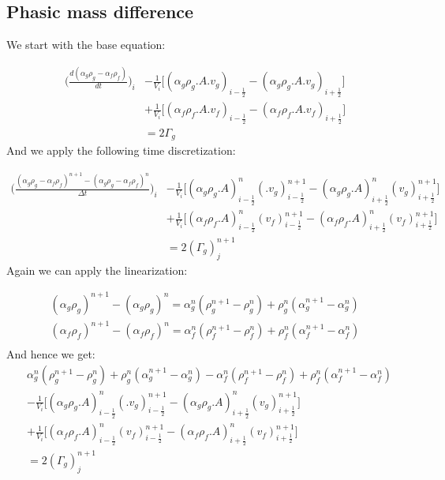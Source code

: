 \documentclass[11pt,letterpaper,titlepage]{article}
\newcommand{\half}{\frac{1}{2}}
\begin{document}
\newpage
\subsection{Phasic mass difference}
We start with the base equation:

\begin{equation*}
\begin{aligned}
\biggr ( \frac{d(\alpha_g \rho_g-\alpha_f\rho_f)}{dt} \biggr )_i
&-\frac{1}{V_i}\biggr[ (\alpha_g\rho_g.A.v_g)_{i-\half}-(\alpha_g\rho_g.A.v_g)_{i+\half} \biggr]\\
&+ \frac{1}{V_i}\biggr[ (\alpha_f\rho_f.A.v_f)_{i-\half}-(\alpha_f\rho_f.A.v_f)_{i+\half} \biggr]\\
&=2\Gamma_g
\end{aligned}
\end{equation*}
\newline
\noindent
And we apply the following time discretization:

\begin{equation*}
\begin{aligned}
\biggr ( \frac{(\alpha_g \rho_g-\alpha_f\rho_f)^{n+1}-(\alpha_g \rho_g-\alpha_f\rho_f)^n}{\Delta t} \biggr )_i
&-\frac{1}{V_i}\biggr[(\alpha_g\rho_g.A)_{i-\half}^{n} (.v_g)_{i-\half}^{n+1}
-(\alpha_g\rho_g.A)_{i+\half}^{n} (v_g)_{i+\half}^{n+1} \biggr]\\
&+ \frac{1}{V_i}\biggr[(\alpha_f\rho_f.A)_{i-\half}^{n} (v_f)_{i-\half}^{n+1}
-(\alpha_f\rho_f.A)_{i+\half}^{n} (v_f)_{i+\half}^{n+1} \biggr]\\
&=2(\Gamma_g)_j^{n+1}
\end{aligned}
\end{equation*}
\newline 
\noindent Again we can apply the linearization:

\begin{equation*}
\begin{aligned}
(\alpha_g \rho_g)^{n+1}-(\alpha_g \rho_g)^{n} = \alpha_g^n (\rho_g^{n+1}-\rho_g^n)+\rho_g^n(\alpha_g^{n+1}-\alpha_g^n)\\
(\alpha_f \rho_f)^{n+1}-(\alpha_f \rho_f)^{n} = \alpha_f^n (\rho_f^{n+1}-\rho_f^n)+\rho_f^n(\alpha_f^{n+1}-\alpha_f^n)\\
\end{aligned}
\end{equation*}
\newline
\noindent And hence we get:
\begin{equation} \label{eq:diffmass}
\begin{aligned}
&\alpha_g^n (\rho_g^{n+1}-\rho_g^n)+\rho_g^n(\alpha_g^{n+1}-\alpha_g^n)-\alpha_f^n (\rho_f^{n+1}-\rho_f^n)+\rho_f^n(\alpha_f^{n+1}-\alpha_f^n)\\
&-\frac{1}{V_i}\biggr[(\alpha_g\rho_g.A)_{i-\half}^{n} (.v_g)_{i-\half}^{n+1}
-(\alpha_g\rho_g.A)_{i+\half}^{n} (v_g)_{i+\half}^{n+1} \biggr]\\
&+ \frac{1}{V_i}\biggr[(\alpha_f\rho_f.A)_{i-\half}^{n} (v_f)_{i-\half}^{n+1}
-(\alpha_f\rho_f.A)_{i+\half}^{n} (v_f)_{i+\half}^{n+1} \biggr]\\
&=2(\Gamma_g)_j^{n+1}
\end{aligned}
\end{equation}
\end{document}
